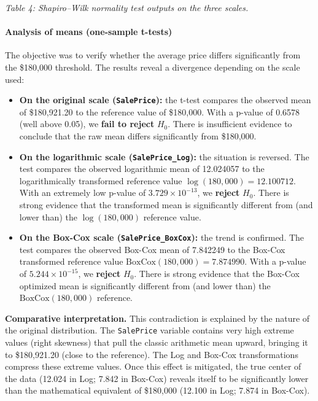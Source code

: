 \emph{Table 4: Shapiro--Wilk normality test outputs on the three
scales.}

\paragraph{Analysis of means (one-sample
t-tests)}\label{analysis-of-means-one-sample-t-tests}

The objective was to verify whether the average price differs
significantly from the \$180,000 threshold. The results reveal a
divergence depending on the scale used:

\begin{itemize}
\tightlist
\item
  \textbf{On the original scale (\texttt{SalePrice}):} the t-test
  compares the observed mean of \$180,921.20 to the reference value of
  \$180,000. With a p-value of 0.6578 (well above 0.05), we \textbf{fail
  to reject} \(H_0\). There is insufficient evidence to conclude that
  the raw mean differs significantly from \$180,000.
\item
  \textbf{On the logarithmic scale (\texttt{SalePrice\_Log}):} the
  situation is reversed. The test compares the observed logarithmic mean
  of 12.024057 to the logarithmically transformed reference value
  \(\log(180{,}000) = 12.100712\). With an extremely low p-value of
  \(3.729 \times 10^{-13}\), we \textbf{reject} \(H_0\). There is strong
  evidence that the transformed mean is significantly different from
  (and lower than) the \(\log(180{,}000)\) reference value.
\item
  \textbf{On the Box-Cox scale (\texttt{SalePrice\_BoxCox}):} the trend
  is confirmed. The test compares the observed Box-Cox mean of 7.842249
  to the Box-Cox transformed reference value
  \(\text{BoxCox}(180{,}000) = 7.874990\). With a p-value of
  \(5.244 \times 10^{-15}\), we \textbf{reject} \(H_0\). There is strong
  evidence that the Box-Cox optimized mean is significantly different
  from (and lower than) the \(\text{BoxCox}(180{,}000)\) reference.
\end{itemize}

\textbf{Comparative interpretation.} This contradiction is explained by
the nature of the original distribution. The \texttt{SalePrice} variable
contains very high extreme values (right skewness) that pull the classic
arithmetic mean upward, bringing it to \$180,921.20 (close to the
reference). The Log and Box-Cox transformations compress these extreme
values. Once this effect is mitigated, the true center of the data
(12.024 in Log; 7.842 in Box-Cox) reveals itself to be significantly
lower than the mathematical equivalent of \$180,000 (12.100 in Log;
7.874 in Box-Cox).

